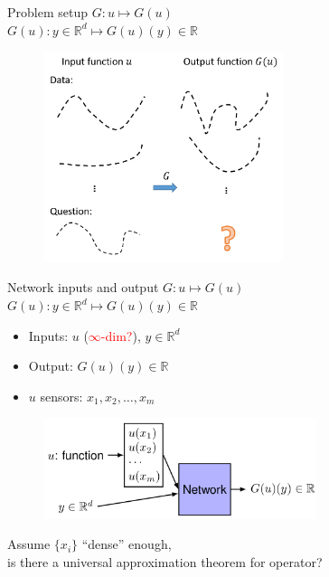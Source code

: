 \documentclass{beamer}
\begin{document}
\begin{frame}{Problem setup}
$G: u \mapsto G(u)$ \\
$G(u): y \in \mathbb{R}^d \mapsto G(u)(y) \in \mathbb{R}$
\begin{figure}
\centering
\includegraphics[width=7cm]{problem.png}
\end{figure}
\end{frame}

\begin{frame}{Network inputs and output}
$G: u \mapsto G(u)$ \\
$G(u): y \in \mathbb{R}^d \mapsto G(u)(y) \in \mathbb{R}$
\begin{itemize}
    \item Inputs: $u$ (\textcolor{red}{$\infty$-dim?}), $y \in \mathbb{R}^d$
    \item Output: $G(u)(y) \in \mathbb{R}$ \pause
    \item $u$ sensors: $x_1, x_2, \dots, x_m$
\end{itemize} \pause
\begin{figure}
\centering
\includegraphics[width=8cm]{io.pdf}
\end{figure}
Assume $\{x_i\}$ ``dense'' enough, \\
is there a universal approximation theorem for operator?
\end{frame}
\end{document}

